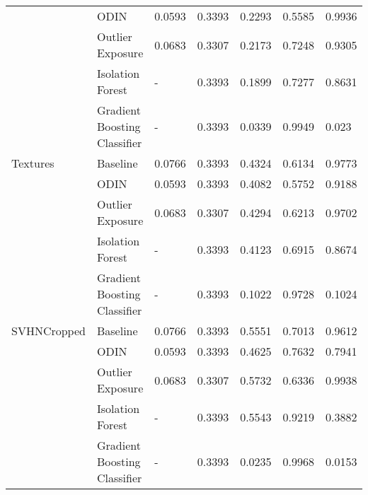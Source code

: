 \begin{tabular}{lllllll}
            & ODIN &        0.0593 &               0.3393 &    0.2293 &  0.5585 &         0.9936 \\
            & Outlier Exposure &        0.0683 &               0.3307 &    0.2173 &  0.7248 &         0.9305 \\
            & Isolation Forest &             - &               0.3393 &    0.1899 &  0.7277 &         0.8631 \\
            & Gradient Boosting Classifier &             - &               0.3393 &    0.0339 &  0.9949 &          0.023 \\
Textures & Baseline &        0.0766 &               0.3393 &    0.4324 &  0.6134 &         0.9773 \\
            & ODIN &        0.0593 &               0.3393 &    0.4082 &  0.5752 &         0.9188 \\
            & Outlier Exposure &        0.0683 &               0.3307 &    0.4294 &  0.6213 &         0.9702 \\
            & Isolation Forest &             - &               0.3393 &    0.4123 &  0.6915 &         0.8674 \\
            & Gradient Boosting Classifier &             - &               0.3393 &    0.1022 &  0.9728 &         0.1024 \\
SVHNCropped & Baseline &        0.0766 &               0.3393 &    0.5551 &  0.7013 &         0.9612 \\
            & ODIN &        0.0593 &               0.3393 &    0.4625 &  0.7632 &         0.7941 \\
            & Outlier Exposure &        0.0683 &               0.3307 &    0.5732 &  0.6336 &         0.9938 \\
            & Isolation Forest &             - &               0.3393 &    0.5543 &  0.9219 &         0.3882 \\
            & Gradient Boosting Classifier &             - &               0.3393 &    0.0235 &  0.9968 &         0.0153 \\
\bottomrule
\end{tabular}
